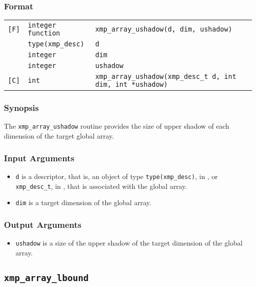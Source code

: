\subsubsection*{Format}

\begin{tabular}{lll}

\verb![F]!& {\tt integer function}& {\tt xmp\_array\_ushadow(d, dim, ushadow)}\\
          & {\tt type(xmp\_desc)} & {\tt d}\\
          & {\tt integer} & {\tt dim}\\
          & {\tt integer} & {\tt ushadow}\\

\verb![C]!&  {\tt int}& {\tt xmp\_array\_ushadow(xmp\_desc\_t d, int dim, int *ushadow)}\\

\end{tabular}

\subsubsection*{Synopsis}

The {\tt xmp\_array\_ushadow} routine provides the size of upper shadow of each dimension of the target global array.


\subsubsection*{Input Arguments}
\begin{itemize}
 \item {\tt d} is a descriptor, that is, an object of type 
       {\tt type(xmp\_desc)}, in {\XMPF}, or {\tt xmp\_desc\_t},
       in {\XMPC}, that is associated with the global array.
 \item {\tt dim} is a target dimension of the global array.
\end{itemize}

\subsubsection*{Output Arguments}
\begin{itemize}
 \item {\tt ushadow} is a size of the upper shadow of the target dimension of the global array.
\end{itemize}


\subsection{\tt xmp\_array\_lbound}

